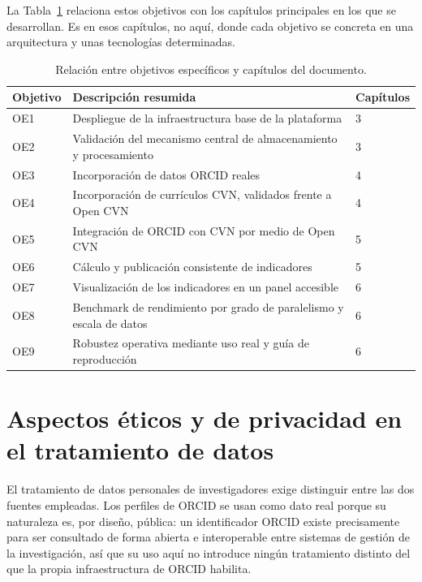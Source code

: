 La Tabla~\ref{tab:tfm_objetivos_capitulos} relaciona estos objetivos con
los capítulos principales en los que se desarrollan. Es en esos capítulos,
no aquí, donde cada objetivo se concreta en una arquitectura y unas
tecnologías determinadas.

\begin{table}[htbp]
  \centering
  \renewcommand{\arraystretch}{1.2}
  \begin{tabular}{p{} p{} p{}}
    \hline
    \textbf{Objetivo} & \textbf{Descripción resumida} & \textbf{Capítulos} \\
    \hline
    OE1 & Despliegue de la infraestructura base de la plataforma & 3 \\
    OE2 & Validación del mecanismo central de almacenamiento y procesamiento & 3 \\
    OE3 & Incorporación de datos ORCID reales & 4 \\
    OE4 & Incorporación de currículos CVN, validados frente a Open CVN & 4 \\
    OE5 & Integración de ORCID con CVN por medio de Open CVN & 5 \\
    OE6 & Cálculo y publicación consistente de indicadores & 5 \\
    OE7 & Visualización de los indicadores en un panel accesible & 6 \\
    OE8 & Benchmark de rendimiento por grado de paralelismo y escala de datos & 6 \\
    OE9 & Robustez operativa mediante uso real y guía de reproducción & 6 \\
    \hline
  \end{tabular}
  \caption{Relación entre objetivos específicos y capítulos del documento.}
  \label{tab:tfm_objetivos_capitulos}
\end{table}

\section{Aspectos éticos y de privacidad en el tratamiento de datos}
\label{sec:introduccion_etica}

El tratamiento de datos personales de investigadores exige distinguir
entre las dos fuentes empleadas. Los perfiles de ORCID se usan como dato
real porque su naturaleza es, por diseño, pública: un identificador ORCID
existe precisamente para ser consultado de forma abierta e interoperable
entre sistemas de gestión de la investigación, así que su uso aquí no
introduce ningún tratamiento distinto del que la propia infraestructura de
ORCID habilita.

